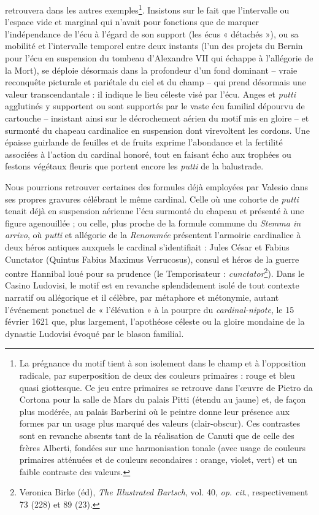\documentclass[12pt,twoside,openany]{book}
\begin{document}
retrouvera dans les autres exemples\footnote{La prégnance du motif tient à son isolement dans le champ et à l’opposition radicale, par superposition de deux des couleurs primaires : rouge et bleu quasi giottesque. Ce jeu entre primaires se retrouve dans l’œuvre de Pietro da Cortona pour la salle de Mars du palais Pitti (étendu au jaune) et, de façon plus modérée, au palais Barberini où le peintre donne leur présence aux formes par un usage plus marqué des valeurs (clair-obscur). Ces contrastes sont en revanche absents tant de la réalisation de Canuti que de celle des frères Alberti, fondées sur une harmonisation tonale (avec usage de couleurs primaires atténuées et de couleurs secondaires : orange, violet, vert) et un faible contraste des valeurs.}. Insistons sur le fait que l’intervalle ou l’espace vide et marginal qui n’avait pour fonctions que de marquer l’indépendance de l’écu à l’égard de son support (les écus « détachés »), ou sa mobilité et l’intervalle temporel entre deux instants (l’un des projets du Bernin pour l’écu en suspension du tombeau d’Alexandre VII qui échappe à l’allégorie de la Mort), se déploie désormais dans la profondeur d’un fond dominant – vraie reconquête picturale et pariétale du ciel et du champ – qui prend désormais une valeur transcendantale : il indique le lieu céleste visé par l’écu. Anges et \textit{putti} agglutinés y supportent ou sont supportés par le vaste écu familial dépourvu de cartouche – insistant ainsi sur le décrochement aérien du motif mis en gloire – et surmonté du chapeau cardinalice en suspension dont virevoltent les cordons. Une épaisse guirlande de feuilles et de fruits exprime l’abondance et la fertilité associées à l’action du cardinal honoré, tout en faisant écho aux trophées ou festons végétaux fleuris que portent encore les \textit{putti} de la balustrade.

Nous pourrions retrouver certaines des formules déjà employées par Valesio dans ses propres gravures célébrant le même cardinal. Celle où une cohorte de \textit{putti} tenait déjà en suspension aérienne l’écu surmonté du chapeau et présenté à une figure agenouillée ; ou celle, plus proche de la formule commune du \textit{Stemma in arrivo}, où \textit{putti} et allégorie de la \textit{Renommée} présentent l’armoirie cardinalice à deux héros antiques auxquels le cardinal s’identifiait : Jules César et Fabius Cunctator (Quintus Fabius Maximus Verrucosus), consul et héros de la guerre contre Hannibal loué pour sa prudence (le Temporisateur : \textit{cunctator}\footnote{Veronica Birke (éd), \textit{The Illustrated Bartsch}, vol. 40, \textit{op. cit}., respectivement 73 (228) et 89 (23).}). Dans le Casino Ludovisi, le motif est en revanche splendidement isolé de tout contexte narratif ou allégorique et il célèbre, par métaphore et métonymie, autant l’événement ponctuel de « l’élévation » à la pourpre du \textit{cardinal-nipote}, le 15 février 1621 que, plus largement, l’apothéose céleste ou la gloire mondaine de la dynastie Ludovisi évoqué par le blason familial.
\end{document}
